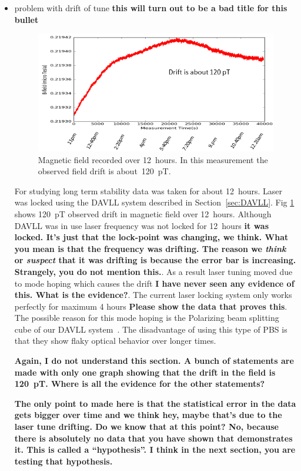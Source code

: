 \begin{itemize}
\item problem with drift of tune {\bf this will turn out to be a bad
  title for this bullet}\\
  \begin{figure}%
    \centering\includegraphics[width=0.6\linewidth]{figures/field_drift}
    \caption{Magnetic field recorded over 12~hours.  In this
      measurement the observed field drift is
      about~120~pT.\label{fig:digilock-drift}}
  \end{figure}
  For studying long term stability data was taken for about
  12~hours. Laser was locked using the DAVLL system described in
  Section~\ref{sec:DAVLL}. Fig \ref{fig:digilock-drift} shows 120~pT
  observed drift in magnetic field over 12~hours. Although DAVLL was
  in use laser frequency was not locked for 12~hours {\bf it was
    locked.  It's just that the lock-point was changing, we think.
    What you mean is that the frequency was drifting.  The reason we
    {\it think} or {\it suspect} that it was drifting is because the
    error bar is increasing.  Strangely, you do not mention this.}. As
  a result laser tuning moved due to mode hoping which causes the
  drift {\bf I have never seen any evidence of this.  What is the
    evidence?}. The current laser locking system only works perfectly
  for maximum 4 hours {\bf Please show the data that proves this}. The
  possible reason for this mode hoping is the Polarizing beam
  splitting cube of our DAVLL system~\cite{principles}. The
  disadvantage of using this type of PBS is that they show flaky
  optical behavior over longer times\cite{bib:Philip2008}.

  {\bf Again, I do not understand this section.  A bunch of statements
    are made with only one graph showing that the drift in the field
    is 120~pT.  Where is all the evidence for the other statements?}

  {\bf The only point to made here is that the statistical error in
    the data gets bigger over time and we think hey, maybe that's due
    to the laser tune drifting.  Do we know that at this point?  No,
    because there is absolutely no data that you have shown that
    demonstrates it.  This is called a ``hypothesis''.  I think in the
    next section, you are testing that hypothesis.}


\end{itemize}
